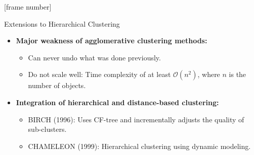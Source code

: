 \documentclass[aspectratio=169,t,xcolor=dvipsnames]{beamer}
\begin{document}
  { %
    [frame number]
    \begin{frame}{Extensions to Hierarchical Clustering}
      \begin{itemize}
        \item \textbf{Major weakness of agglomerative clustering methods:}
        \begin{itemize}
          \item Can never undo what was done previously.
          \item Do not scale well: Time complexity of at least $\mathcal{O}(n^2)$, where $n$ is the number of objects.
        \end{itemize}
        \item \textbf{Integration of hierarchical and distance-based clustering:}
        \begin{itemize}
          \item BIRCH (1996): Uses CF-tree and incrementally adjusts the quality of sub-clusters.
          \item CHAMELEON (1999): Hierarchical clustering using dynamic modeling.
        \end{itemize}
      \end{itemize}
    \end{frame}
  }
\end{document}
